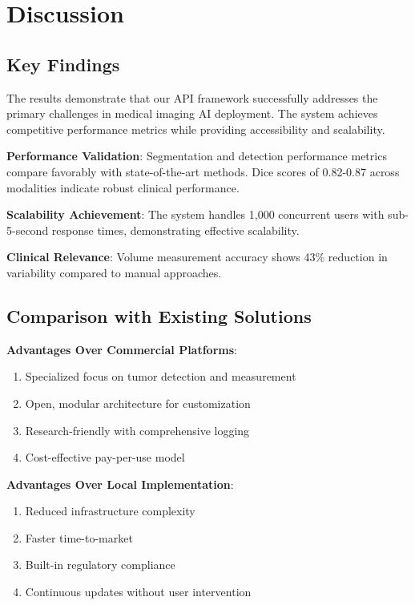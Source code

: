 \documentclass[12pt,a4paper]{article}
\begin{document}
\section{Discussion}

\subsection{Key Findings}

The results demonstrate that our API framework successfully addresses the primary challenges in medical imaging AI deployment. The system achieves competitive performance metrics while providing accessibility and scalability.

\textbf{Performance Validation}: Segmentation and detection performance metrics compare favorably with state-of-the-art methods. Dice scores of 0.82-0.87 across modalities indicate robust clinical performance.

\textbf{Scalability Achievement}: The system handles 1,000 concurrent users with sub-5-second response times, demonstrating effective scalability.

\textbf{Clinical Relevance}: Volume measurement accuracy shows 43\% reduction in variability compared to manual approaches.

\subsection{Comparison with Existing Solutions}

\textbf{Advantages Over Commercial Platforms}:
\begin{enumerate}
    \item Specialized focus on tumor detection and measurement
    \item Open, modular architecture for customization
    \item Research-friendly with comprehensive logging
    \item Cost-effective pay-per-use model
\end{enumerate}

\textbf{Advantages Over Local Implementation}:
\begin{enumerate}
    \item Reduced infrastructure complexity
    \item Faster time-to-market
    \item Built-in regulatory compliance
    \item Continuous updates without user intervention
\end{enumerate}
\end{document}
